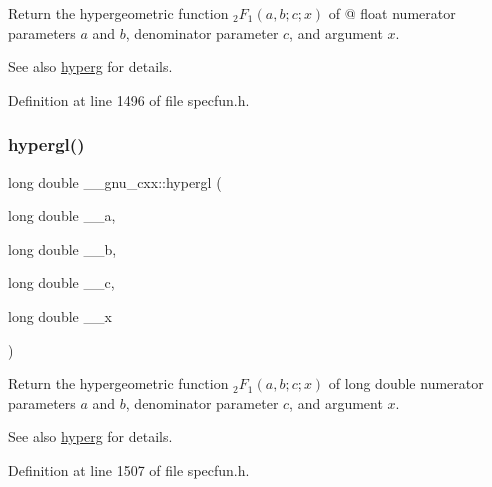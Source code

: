 Return the hypergeometric function $ {}_2F_1(a,b;c;x) $ of @ float numerator parameters $ a $ and $ b $, denominator parameter $ c $, and argument $ x $.

\begin{DoxySeeAlso}{See also}
\hyperlink{group__gnu__math__spec__func_ga374198e4076f9e23f3878ca3af70e6da}{hyperg} for details. 
\end{DoxySeeAlso}


Definition at line 1496 of file specfun.\+h.

\mbox{\label{group__gnu__math__spec__func_ga9961967087216e97f76283f29e1be152}} 
\subsubsection{\texorpdfstring{hypergl()}{hypergl()}}
{\footnotesize\ttfamily long double \+\_\+\+\_\+gnu\+\_\+cxx\+::hypergl (\begin{DoxyParamCaption}\item[{long double}]{\+\_\+\+\_\+a,  }\item[{long double}]{\+\_\+\+\_\+b,  }\item[{long double}]{\+\_\+\+\_\+c,  }\item[{long double}]{\+\_\+\+\_\+x }\end{DoxyParamCaption})\hspace{0.3cm}{\ttfamily [inline]}}

Return the hypergeometric function $ {}_2F_1(a,b;c;x) $ of {\ttfamily long double} numerator parameters $ a $ and $ b $, denominator parameter $ c $, and argument $ x $.

\begin{DoxySeeAlso}{See also}
\hyperlink{group__gnu__math__spec__func_ga374198e4076f9e23f3878ca3af70e6da}{hyperg} for details. 
\end{DoxySeeAlso}


Definition at line 1507 of file specfun.\+h.

\mbox{\label{group__gnu__math__spec__func_ga1fa9e260ba85fc043e3d2ada99c0143c}} 
